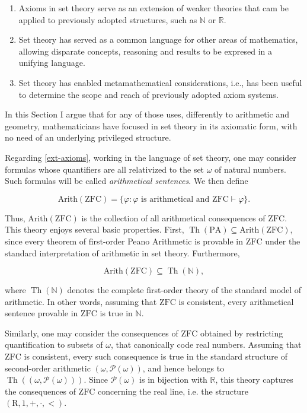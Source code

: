 \documentclass[11pt,a4paper]{book}
\theoremstyle{plain}
\begin{document}
\begin{enumerate}

\item \label{ext-axioms} Axioms in set theory serve as an extension of weaker theories that cam be applied to previously adopted structures, such as $\mathbb{N}$ or $\mathbb{R}$.

\item \label{common-language} Set theory has served as a common language for other areas of mathematics, allowing disparate concepts, reasoning and results to be expresed in a unifying language.

\item \label{metamathematics} Set theory has enabled metamathematical considerations, i.e., has been useful to determine the scope and reach of previously adopted axiom systems.

\end{enumerate}

In this Section I argue that for any of those uses, differently to arithmetic and geometry, mathematicians have focused in set theory in its axiomatic form, with no need of an underlying privileged structure.

Regarding \ref{ext-axioms}, working in the language of set theory, one may consider formulas whose quantifiers are all relativized to the set $\omega$ of natural numbers. Such formulas will be called \emph{arithmetical sentences}. We then define

$$ \mathrm{Arith}(\mathrm{ZFC}) = \{\varphi : \varphi \text{ is arithmetical and } \mathrm{ZFC}\vdash\varphi\}.$$

Thus, $\mathrm{Arith}(\mathrm{ZFC})$ is the collection of all arithmetical consequences of $\mathrm{ZFC}$. This theory enjoys several basic properties. First, $\operatorname{Th}(\mathrm{PA}) \subseteq \mathrm{Arith}(\mathrm{ZFC})$, since every theorem of first-order Peano Arithmetic is provable in $\mathrm{ZFC}$ under the standard interpretation of arithmetic in set theory. Furthermore,

$$ \mathrm{Arith}(\mathrm{ZFC}) \subseteq \operatorname{Th}(\mathbb{N}), $$

where $\operatorname{Th}(\mathbb{N})$ denotes the complete first-order theory of the standard model of arithmetic. In other words, assuming that $\mathrm{ZFC}$ is consistent, every arithmetical sentence provable in $\mathrm{ZFC}$ is true in $\mathbb{N}$.

Similarly, one may consider the consequences of $\mathrm{ZFC}$ obtained by restricting quantification to subsets of $\omega$, that canonically code real numbers. Assuming that $\mathrm{ZFC}$ is consistent, every such consequence is true in the standard structure of second-order arithmetic $(\omega, \mathcal{P}(\omega))$, and hence belongs to $\operatorname{Th}((\omega, \mathcal{P}(\omega)))$. Since $\mathcal{P}(\omega)$ is in bijection with $\mathbb{R}$, this theory captures the consequences of $\mathrm{ZFC}$ concerning the real line, i.e. the structure $(\mathrm{R}, 1, +, \cdot, <)$.
\end{document}
